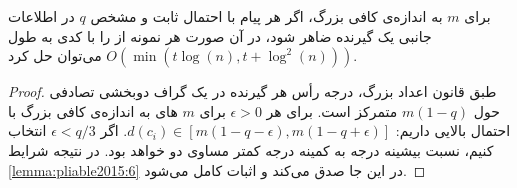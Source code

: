 \begin{theorem}
    \cite{pliable2015paper}
    \label{thm:pliable2015_8}
    برای
    $m$
    به اندازه‌ی کافی بزرگ، اگر هر پیام با احتمال ثابت و مشخص
    $q$
    در اطلاعات جانبی یک گیرنده ضاهر شود، در آن صورت هر نمونه از
    را با کدی به طول
    $O(\min(t \log(n), t + \log^2(n)))$
    می‌توان حل کرد.
\end{theorem}
\begin{proof}
    طبق قانون اعداد بزرگ، درجه رأس هر گیرنده در یک گراف دوبخشی تصادفی حول
    $m (1 - q)$
    متمرکز است. برای هر
    $\epsilon > 0$
    برای
    $m$    های به اندازه‌ی کافی بزرگ با احتمال بالایی داریم:
    $d(c_i) \in [m(1 - q - \epsilon), m(1 - q + \epsilon)]$. اگر
    $\epsilon < q/3$
    انتخاب کنیم، نسبت بیشینه درجه به کمینه درجه کمتر مساوی دو خواهد بود. در نتیجه شرایط
    \autoref{lemma:pliable2015:6}
    در این جا صدق می‌کند و اثبات کامل می‌شود.
\end{proof}
